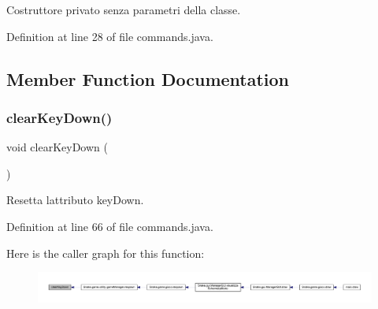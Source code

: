 Costruttore privato senza parametri della classe. 



Definition at line 28 of file commands.\+java.



\subsection{Member Function Documentation}
\mbox{\label{class_snake_1_1game_1_1utility_1_1commands_a8b2e8ab4e21c2a33e48e38fb8567fb19}} 
\subsubsection{\texorpdfstring{clear\+Key\+Down()}{clearKeyDown()}}
{\footnotesize\ttfamily void clear\+Key\+Down (\begin{DoxyParamCaption}{ }\end{DoxyParamCaption})}



Resetta l\textquotesingle{}attributo key\+Down. 



Definition at line 66 of file commands.\+java.

Here is the caller graph for this function\+:
\nopagebreak
\begin{figure}[H]
\begin{center}
\leavevmode
\includegraphics[width=350pt]{class_snake_1_1game_1_1utility_1_1commands_a8b2e8ab4e21c2a33e48e38fb8567fb19_icgraph}
\end{center}
\end{figure}
\mbox{\label{class_snake_1_1game_1_1utility_1_1commands_a66de6f4fd0fc79b7d17dc3196aa5fe7e}} 
